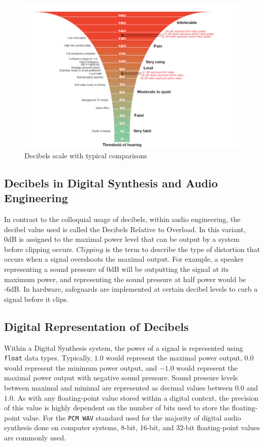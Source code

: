 \documentclass[a4paper,12pt]{report}
\begin{document}
\begin{figure}
    \centering
    \includegraphics[width=36em]{DecibelsScale.png}
    \caption{Decibels scale with typical comparisons}
    \label{fig:decibelsscale}
\end{figure}

\subsection{Decibels in Digital Synthesis and Audio Engineering}
\label{subsec:decibelindigitalsynthesis}
In contrast to the colloquial usage of decibels, within audio engineering, the decibel value used is called the Decibels Relative to Overload.  In this variant, 0dB is assigned to the maximal power level that can be output by a system before clipping occurs. $Clipping$ is the term to describe the type of distortion that occurs when a signal overshoots the maximal output. For example, a speaker representing a sound pressure of 0dB will be outputting the signal at its maximum power, and representing the sound pressure at half power would be -6dB. In hardware, safeguards are implemented at certain decibel levels to curb a signal before it clips.

\subsection{Digital Representation of Decibels}
\label{subsec:digitalrepdecibels}
Within a Digital Synthesis system, the power of a signal is represented using \texttt{float} data types. Typically, $1.0$ would represent the maximal power output, $0.0$ would represent the minimum power output, and $-1.0$ would represent the maximal power output with negative sound pressure. Sound pressure levels between maximal and minimal are represented as decimal values between $0.0$ and $1.0$. As with any floating-point value stored within a digital context, the precision of this value is highly dependent on the number of bits used to store the floating-point value. For the \texttt{PCM\ WAV} standard used for the majority of digital audio synthesis done on computer systems, 8-bit, 16-bit, and 32-bit floating-point values are commonly used.
\end{document}
